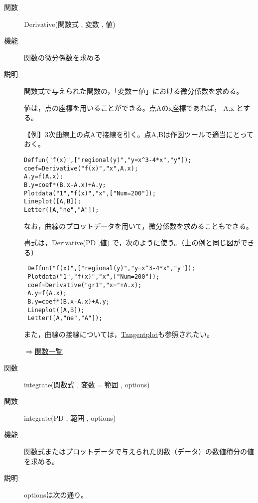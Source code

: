 \documentclass[papersize,a4paper,10pt,uplatex]{jsarticle}
\begin{document}
\begin{description}

\hypertarget{derivative}{}
\item[関数]Derivative(関数式 , 変数 , 値)
\item[機能]関数の微分係数を求める
\item[説明]関数式で与えられた関数の，「変数＝値」における微分係数を求める。

値は，点の座標を用いることができる。点Aのx座標であれば， A.x とする。

\vspace{\baselineskip}
【例】3次曲線上の点Aで接線を引く。点A,Bは作図ツールで適当にとっておく。
\begin{verbatim}
Deffun("f(x)",["regional(y)","y=x^3-4*x","y"]);
coef=Derivative("f(x)","x",A.x);
A.y=f(A.x);
B.y=coef*(B.x-A.x)+A.y;
Plotdata("1","f(x)","x",["Num=200"]);
Lineplot([A,B]);
Letter([A,"ne","A"]);
\end{verbatim}
\begin{center}  \end{center}


なお，曲線のプロットデータを用いて，微分係数を求めることもできる。

書式は，Derivative(PD ,値) で，次のように使う。（上の例と同じ図ができる）

\begin{verbatim}
 Deffun("f(x)",["regional(y)","y=x^3-4*x","y"]);
 Plotdata("1","f(x)","x",["Num=200"]);
 coef=Derivative("gr1","x="+A.x);
 A.y=f(A.x);
 B.y=coef*(B.x-A.x)+A.y;
 Lineplot([A,B]);
 Letter([A,"ne","A"]);
\end{verbatim}

また，曲線の接線については，\hyperlink{tangentplot}{Tangentplot}も参照されたい。

\begin{flushright}\hyperlink{functionlist}{$\Rightarrow$関数一覧}\end{flushright}

\vspace{\baselineskip}
\hypertarget{integrate}{}
\item[関数]integrate(関数式 , 変数$=$範囲 , options)
\item[関数]integrate(PD , 範囲 , options)
\item[機能]関数式またはプロットデータで与えられた関数（データ）の数値積分の値を求める。
\item[説明]optionsは次の通り。


\end{description}
\end{document}
